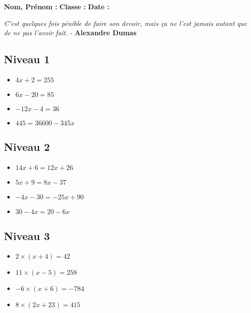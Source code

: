 \vspace{4cm}

\textbf{Nom, Prénom :} \hspace{8cm} \textbf{Classe :} \hspace{3cm} \textbf{Date :}\\

\begin{center}
  \textit{C'est quelques fois pénible de faire son devoir, mais ça ne l'est jamais autant que de ne pas l'avoir fait.} - \textbf{Alexandre Dumas}
\end{center}


\begin{multicols}{3}

\subsection*{Niveau 1}

\begin{itemize}[label={$\bullet$}]
  \item $4x + 2 = 255$ \\
  \item $6x - 20 = 85$ \\
  \item $-12x - 4 = 36$ \\
  \item $445 = 36 600 - 345x$
\end{itemize} \columnbreak

\subsection*{Niveau 2}

\begin{itemize}[label={$\bullet$}]
  \item $14x + 6 = 12x + 26$ \\
  \item $5x + 9 = 8x - 37$ \\
  \item $-4x - 30 = - 25x + 90$ \\
  \item $30 - 4x = 20 - 6x$
\end{itemize} \columnbreak


\subsection*{Niveau 3}

\begin{itemize}[label={$\bullet$}]
  \item $2 \times (x+4) = 42$ \\
  \item $11 \times (x-5) = 258$ \\
  \item $-6 \times (x+6) = -784$ \\
  \item $8 \times (2x+23) = 415$
\end{itemize}

\end{multicols}

